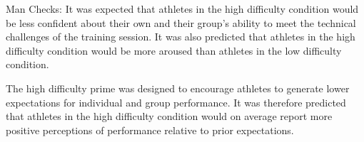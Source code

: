 





Man Checks:
It was expected that athletes in the high difficulty condition would be less confident about their own and their group's ability to meet the technical challenges of the training session.  It was also predicted that athletes in the high difficulty condition would be more aroused than athletes in the low difficulty condition.

The high difficulty prime was designed to encourage athletes to generate lower expectations for individual and group performance. It was therefore predicted that athletes in the high difficulty condition would on average report more positive perceptions of performance relative to prior expectations.














